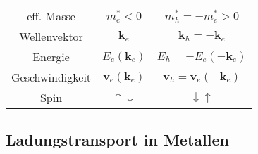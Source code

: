 \begin{itemize}
\begin{table}[H]
\begin{tabular}{c|c|c}
                eff. Masse & $m_e^* < 0$ & $m_h^* = - m_e^* > 0$ \\
                Wellenvektor & $\textbf{k}_e$ & $\textbf{k}_h = - \textbf{k}_e$ \\
                Energie & $E_e(\textbf{k}_e)$ & $E_h = - E_e(-\textbf{k}_e)$ \\
                Geschwindigkeit & $\textbf{v}_e(\textbf{k}_e)$ & $ \textbf{v}_h = \textbf{v}_e (- \textbf{k}_e)$ \\
                Spin & $\uparrow \downarrow$ & $ \downarrow \uparrow $
            \end{tabular}
        \end{table}
\end{itemize}



\subsection{Ladungstransport in Metallen} \label{sec:6_3}
